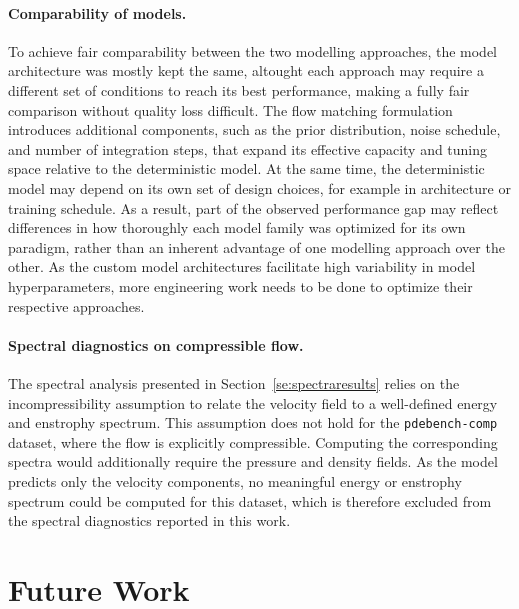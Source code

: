 \paragraph{Comparability of models.} To achieve fair comparability between the two modelling approaches, the model architecture was mostly kept the same, altought each approach may require a different set of conditions to reach its best performance, making a fully fair comparison without quality loss difficult. The flow matching formulation introduces additional components, such as the prior distribution, noise schedule, and number of integration steps, that expand its effective capacity and tuning space relative to the deterministic model. At the same time, the deterministic model may depend on its own set of design choices, for example in architecture or training schedule. As a result, part of the observed performance gap may reflect differences in how thoroughly each model family was optimized for its own paradigm, rather than an inherent advantage of one modelling approach over the other. As the custom model architectures facilitate high variability in model hyperparameters, more engineering work needs to be done to optimize their respective approaches.

\paragraph{Spectral diagnostics on compressible flow.} The spectral analysis presented in Section~\ref{se:spectraresults} relies on the incompressibility assumption to relate the velocity field to a well-defined energy and enstrophy spectrum. This assumption does not hold for the \texttt{pdebench-comp} dataset, where the flow is explicitly compressible. Computing the corresponding spectra would additionally require the pressure and density fields. As the model predicts only the velocity components, no meaningful energy or enstrophy spectrum could be computed for this dataset, which is therefore excluded from the spectral diagnostics reported in this work.

\section{Future Work}

